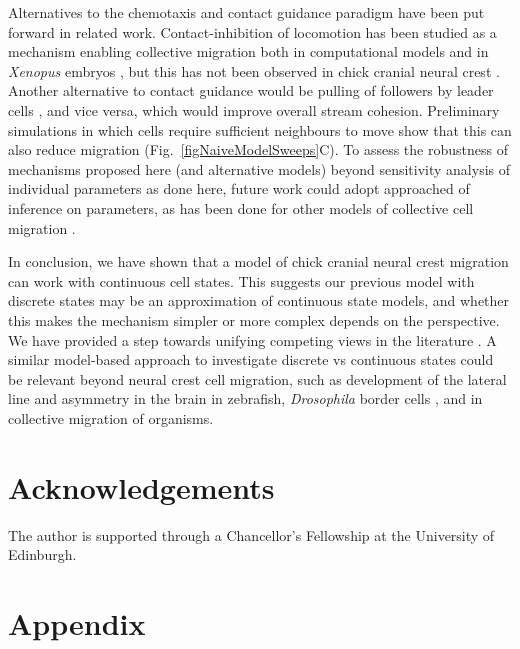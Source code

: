 \documentclass[review]{elsarticle}
\begin{document}
Alternatives to the chemotaxis and contact guidance paradigm have been put forward in related work. Contact-inhibition of locomotion has been studied as a mechanism enabling collective migration both in computational models and in \textsl{Xenopus} embryos \cite{Carmona-Fontaine2011}, but this has not been observed in chick cranial neural crest \cite{Genuth2018}. Another alternative to contact guidance would be pulling of followers by leader cells \cite{Yates2018}, and vice versa, which would improve overall stream cohesion. Preliminary simulations in which cells require sufficient neighbours to move show that this can also reduce migration (Fig.~\ref{figNaiveModelSweeps}C). To assess the robustness of mechanisms proposed here (and alternative models) beyond sensitivity analysis of individual parameters as done here, future work could adopt approached of inference on parameters, as has been done for other models of collective cell migration \cite{Ross2017}.

In conclusion, we have shown that a model of chick cranial neural crest migration can work with continuous cell states. This suggests our previous model with discrete states may be an approximation of continuous state models, and whether this makes the mechanism simpler or more complex depends on the perspective. We have provided a step towards unifying competing views in the literature \cite{Schumacher2016a}. A similar model-based approach to investigate discrete vs continuous states could be relevant beyond neural crest cell migration, such as development of the lateral line \cite{Dona2013} and asymmetry in the brain \cite{Roussigne2018} in zebrafish, \textsl{Drosophila} border cells \cite{Inaki2012}, and in collective migration of organisms.

\section*{Acknowledgements} The author is supported through a Chancellor's Fellowship at the University of Edinburgh.%
\section*{Appendix}
\renewcommand{\thefigure}{S\arabic{figure}}
\setcounter{figure}{0}
\renewcommand{\thesection}{S}
\end{document}
